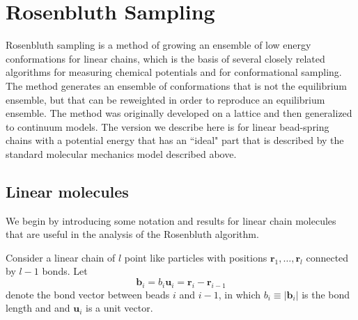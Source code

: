\documentclass[12pt]{article}
\newcommand{\vv}[1]{\mathbf{#1}}
\newcommand\vbead{\vv{r}}
\newcommand\nbead{l}
\newcommand\vbond{\vv{b}}
\newcommand\ubond{\vv{u}}
\newcommand\rbond{b}
\newcommand\nbond{l-1}
\begin{document}
\section{Rosenbluth Sampling} %
Rosenbluth sampling is a method of growing an ensemble of low energy conformations for linear chains, which is the basis of several closely related algorithms for measuring chemical potentials and for conformational sampling. The method generates an ensemble of conformations that is not the equilibrium ensemble, but that can be reweighted in order to reproduce an equilibrium ensemble. The method was originally developed on a lattice and then generalized to continuum models. The version we describe here is for linear bead-spring chains with a potential energy that has an ``ideal" part that is described by the standard molecular mechanics model described above. 

\subsection{Linear molecules}
We begin by introducing some notation and results for linear chain molecules that are useful in the analysis of the Rosenbluth algorithm.

Consider a linear chain of $\nbead$ point like particles with positions $\vbead_{1},\ldots,\vbead_{\nbead}$ connected by $\nbond$ bonds. Let 
\begin{equation}
   \vbond_{i} = \rbond_{i} \ubond_{i} = \vbead_{i} - \vbead_{i-1}
\end{equation}
denote the bond vector between beads $i$ and $i-1$, in which $\rbond_{i} \equiv |\vbond_{i}|$ is the bond length and and $\ubond_{i}$ is a unit vector.  
\end{document}
